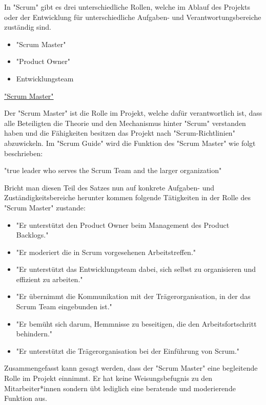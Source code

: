 
In "Scrum" gibt es drei unterschiedliche Rollen, welche im Ablauf des Projekts oder der Entwicklung für unterschiedliche Aufgaben- und Verantwortungsbereiche zuständig sind.

\begin{itemize}
    \item "Scrum Master"
    \item "Product Owner"
    \item Entwicklungsteam
\end{itemize}

\cite{Scrum}

\underline{"Scrum Master"}

Der "Scrum Master" ist die Rolle im Projekt, welche dafür verantwortlich ist, dass alle Beteiligten die Theorie und den Mechanismus hinter "Scrum" verstanden haben und die Fähigkeiten besitzen das Projekt nach "Scrum-Richtlinien" abzuwickeln. Im "Scrum Guide" wird die Funktion des "Scrum Master" wie folgt beschrieben:

"true leader who serves the Scrum Team and the larger organization" \cite{ScrumMaster}

Bricht man diesen Teil des Satzes nun auf konkrete Aufgaben- und Zuständigkeitsbereiche herunter kommen folgende Tätigkeiten in der Rolle des "Scrum Master" zustande:

\begin{itemize}
    \item "Er unterstützt den Product Owner beim Management des Product Backlogs." \cite{ScrumMaster}
    \item "Er moderiert die in Scrum vorgesehenen Arbeitstreffen." \cite{ScrumMaster}
    \item "Er unterstützt das Entwicklungsteam dabei, sich selbst zu organisieren und effizient zu arbeiten." \cite{ScrumMaster}
    \item "Er übernimmt die Kommunikation mit der Trägerorganisation, in der das Scrum Team eingebunden ist." \cite{ScrumMaster}
    \item "Er bemüht sich darum, Hemmnisse zu beseitigen, die den Arbeitsfortschritt behindern." \cite{ScrumMaster}
    \item "Er unterstützt die Trägerorganisation bei der Einführung von Scrum." \cite{ScrumMaster}
\end{itemize}

Zusammengefasst kann gesagt werden, dass der "Scrum Master" eine begleitende Rolle im Projekt einnimmt. Er hat keine Weisungsbefugnis zu den Mitarbeiter*innen sondern übt lediglich eine beratende und moderierende Funktion aus.

